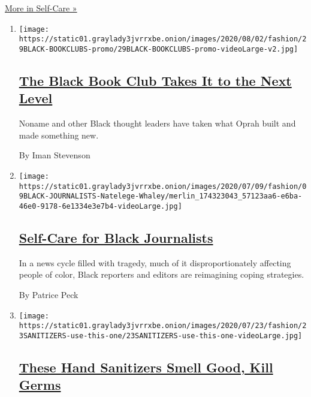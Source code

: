 \href{/section/style/self-care}{More in Self-Care »}

\begin{enumerate}
\def\labelenumi{\arabic{enumi}.}
\item
  \texttt{[image: https://static01.graylady3jvrrxbe.onion/images/2020/08/02/fashion/29BLACK-BOOKCLUBS-promo/29BLACK-BOOKCLUBS-promo-videoLarge-v2.jpg]}

  \hypertarget{the-black-book-club-takes-it-to-the-next-level}{%
  \subsection{\texorpdfstring{\href{/2020/07/29/style/self-care/black-book-clubs.html}{The
  Black Book Club Takes It to the Next
  Level}}{The Black Book Club Takes It to the Next Level}}\label{the-black-book-club-takes-it-to-the-next-level}}

  Noname and other Black thought leaders have taken what Oprah built and
  made something new.

  By Iman Stevenson
\item
  \texttt{[image: https://static01.graylady3jvrrxbe.onion/images/2020/07/09/fashion/09BLACK-JOURNALISTS-Natelege-Whaley/merlin\_174323043\_57123aa6-e6ba-46e0-9178-6e1334e3e7b4-videoLarge.jpg]}

  \hypertarget{self-care-for-black-journalists}{%
  \subsection{\texorpdfstring{\href{/2020/07/14/style/self-care/black-journalists.html}{Self-Care
  for Black
  Journalists}}{Self-Care for Black Journalists}}\label{self-care-for-black-journalists}}

  In a news cycle filled with tragedy, much of it disproportionately
  affecting people of color, Black reporters and editors are reimagining
  coping strategies.

  By Patrice Peck
\item
  \texttt{[image: https://static01.graylady3jvrrxbe.onion/images/2020/07/23/fashion/23SANITIZERS-use-this-one/23SANITIZERS-use-this-one-videoLarge.jpg]}

  \hypertarget{these-hand-sanitizers-smell-good-kill-germs}{%
  \subsection{\texorpdfstring{\href{/2020/07/22/style/these-hand-sanitizers-smell-good-kill-germs.html}{These
  Hand Sanitizers Smell Good, Kill
  Germs}}{These Hand Sanitizers Smell Good, Kill Germs}}\label{these-hand-sanitizers-smell-good-kill-germs}}


\end{enumerate}
